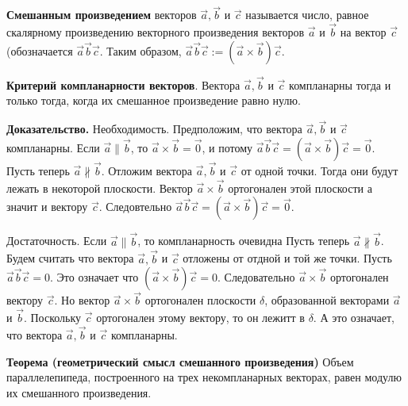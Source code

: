 \documentclass[a4paper]{article}
\begin{document}
    \textbf{Смешанным произведением} векторов $\vec{a}, \vec{b}$ и $\vec{c}$ называется число, равное
    скалярному произведению векторного произведения векторов $\vec{a}$ и $\vec{b}$
    на вектор $\vec{c}$ (обозначается $\vec{a} \vec{b} \vec{c}$.
    Таким образом, $\vec{a} \vec{b} \vec{c} := (\vec{a} \times \vec{b}) \vec{c}$.

    \begin{htheorem}
        \textbf{Критерий компланарности векторов}. Вектора $\vec{a}, \vec{b}$ и $\vec{c}$ компланарны тогда и только тогда, когда их смешанное
        произведение равно нулю.
    \end{htheorem}

    \begin{hproof}
        \textbf{Доказательство.} Необходимость. Предположим, что вектора $\vec{a}, \vec{b}$ и $\vec{c}$ компланарны. Если $\vec{a} \parallel \vec{b}$, то $\vec{a} \times \vec{b} = \vec{0}$, и потому $\vec{a} \vec{b} \vec{c} = (\vec{a} \times \vec{b} ) \vec{c} = \vec{0}$. \\
        Пусть теперь $\vec{a} \nparallel \vec{b}$. Отложим вектора $\vec{a}, \vec{b}$ и $\vec{c}$ от одной точки. Тогда они будут лежать в некоторой плоскости. Вектор $\vec{a} \times \vec{b}$ ортогонален этой плоскости а значит и вектору $\vec{c}$. Следовтельно $\vec{a} \vec{b} \vec{c} = (\vec{a} \times \vec{b} ) \vec{c} = \vec{0}$.

        Достаточность. Если $\vec{a} \parallel \vec{b}$, то компланарность очевидна Пусть теперь $\vec{a} \nparallel \vec{b}$. Будем считать что вектора $\vec{a}, \vec{b}$ и $\vec{c}$ отложены от отдной и той же точки. Пусть $\vec{a} \vec{b} \vec{c} = 0$. Это означает что $(\vec{a} \times \vec{b}) \vec{c} = 0$. Следовательно $\vec{a} \times \vec{b}$ ортогонален вектору $\vec{c}$. Но вектор $\vec{a} \times \vec{b}$ ортогонален плоскости $\delta$, образованной векторами $\vec{a}$ и $\vec{b}$. Поскольку $\vec{c}$ ортогонален этому вектору, то он лежитт в $\delta$. А это означает, что вектора $\vec{a}, \vec{b}$ и $\vec{c}$ компланарны.
    \end{hproof}


    \begin{htheorem}
        \textbf{Теорема  (геометрический смысл смешанного произведения)} Объем параллелепипеда, построенного на трех некомпланарных векторах,
        равен модулю их смешанного произведения.
    \end{htheorem}
\end{document}
